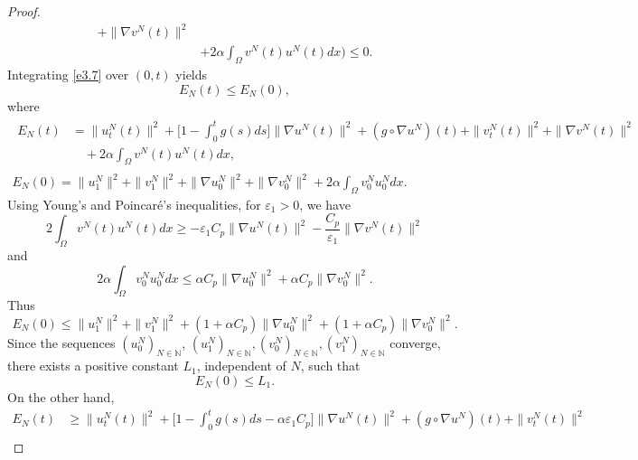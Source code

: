 \documentclass[11pt]{article}
\numberwithin{equation}{section}
\begin{document}
\begin{proof}
\begin{equation}
\begin{aligned}
 + \| \nabla v^N (t)\|^2 \\
&+ 2 \alpha \int_{\Omega} v^N(t) u^N(t) dx\Big)\leq 0.
\end{aligned} \label{e3.7}
\end{equation}
Integrating \eqref{e3.7} over $(0, t)$ yields
\begin{equation}
 E_N(t)\leq E_N(0), \label{e3.8}
\end{equation}
where
 \begin{gather*}
 \begin{aligned}
E_N(t)&=\| u^N_{t} (t) \|^2 + \Big[ 1-\int_0^t g(s)ds\Big] \| \nabla u^N(t) \|^2 +(g\circ\nabla u^N)(t)
 +\| v^N_{t}(t) \|^2 + \| \nabla v^N(t) \|^2\\
&\quad + 2 \alpha \int_{\Omega} v^N(t) u^N(t) dx,
\end{aligned}\\
E_N(0)= \| u^N_{1} \|^2 + \| v^N_{1} \|^2 +\| \nabla u^N_0 \|^2
 +\| \nabla v^N_0 \|^2+ 2 \alpha \int_{\Omega} v^N_0 u^N_0 dx.
\end{gather*}
Using Young's and Poincar\'e's inequalities, for $\varepsilon_{1}> 0$, we have
 \begin{equation}
 2\int_{\Omega} v^N(t) u^N(t) dx\geq - \varepsilon_{1} C_p\| \nabla u^N (t) \|^2 - \frac{C_p}{\varepsilon_{1}} \| \nabla v^N (t) \|^2
 \label{e3.9}
 \end{equation}
and
 \begin{equation}
 2 \alpha \int_{\Omega} v^N_0 u^N_0 dx\leq \alpha C_p\| \nabla u^N_0 \|^2 + \alpha C_p \| \nabla v^N_0 \|^2.
 \label{e3.10}
 \end{equation}
Thus
\begin{equation}
 E_N(0)\leq \| u^N_{1} \|^2 + \| v^N_{1} \|^2 +(1+\alpha C_p)\| \nabla u^N_0 \|^2 +(1+\alpha C_p)\| \nabla v^N_0 \|^2.\label{e3.11}
 \end{equation}
Since the sequences $ (u_0^N)_{N \in \mathbb{N}}$,
$ (u_1^N)_{N \in \mathbb{N}}, (v_0^N)_{N \in \mathbb{N}}, (v_1^N)_{N \in \mathbb{N}} $ converge, there exists a positive constant $L_{1}$, independent of $N$, such that
\begin{equation}
E_N(0)\leq L_{1}.\label{e3.12}
\end{equation}
On the other hand,
\begin{equation}
\begin{aligned}
E_N(t)
&\geq \| u^N_{t}(t) \|^2 + \Big[ 1-\int_0^t g(s)ds -\alpha \varepsilon_{1} C_p \Big]
 \| \nabla u^N(t) \|^2 +(g\circ\nabla u^N)(t)+\| v^N_{t} (t) \|^2 \\

\end{aligned}
\end{equation}
\end{proof}
\end{document}
